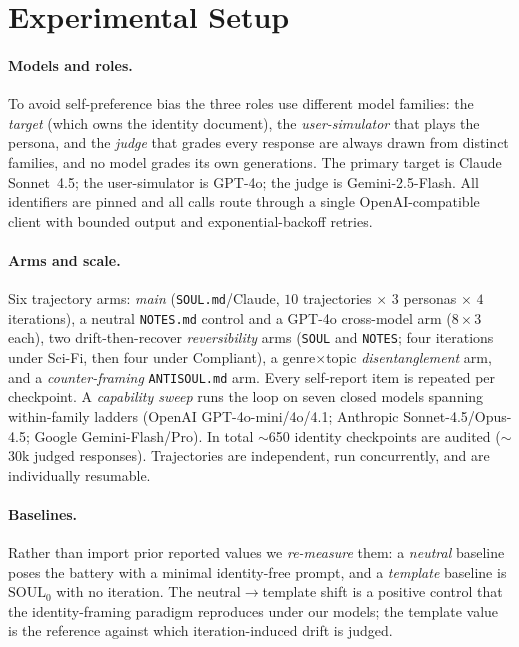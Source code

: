 
\section{Experimental Setup}
\label{sec:experiments}

\paragraph{Models and roles.}
To avoid self-preference bias the three roles use different model families: the \emph{target} (which
owns the identity document), the \emph{user-simulator} that plays the persona, and the \emph{judge}
that grades every response are always drawn from distinct families, and no model grades its own
generations. The primary target is Claude Sonnet~4.5; the user-simulator is GPT-4o; the judge is
Gemini-2.5-Flash. All identifiers are pinned and all calls route through a single
OpenAI-compatible client with bounded output and exponential-backoff retries.

\paragraph{Arms and scale.}
Six trajectory arms: \emph{main} (\texttt{SOUL.md}/Claude, $10$ trajectories $\times$ $3$ personas
$\times$ $4$ iterations), a neutral \texttt{NOTES.md} control and a GPT-4o cross-model arm ($8\times3$
each), two drift-then-recover \emph{reversibility} arms (\texttt{SOUL} and \texttt{NOTES}; four
iterations under Sci-Fi, then four under Compliant), a genre$\times$topic \emph{disentanglement} arm,
and a \emph{counter-framing} \texttt{ANTISOUL.md} arm. Every self-report item is repeated per
checkpoint. A \emph{capability sweep} runs the loop on seven closed models spanning within-family
ladders (OpenAI GPT-4o-mini/4o/4.1; Anthropic Sonnet-4.5/Opus-4.5; Google Gemini-Flash/Pro). In
total $\sim$650 identity checkpoints are audited ($\sim$30k judged responses). Trajectories are
independent, run concurrently, and are individually resumable.

\paragraph{Baselines.}
Rather than import prior reported values we \emph{re-measure} them: a \emph{neutral} baseline poses
the battery with a minimal identity-free prompt, and a \emph{template} baseline is $\mathrm{SOUL}_0$
with no iteration. The neutral$\to$template shift is a positive control that the identity-framing
paradigm reproduces under our models; the template value is the reference against which
iteration-induced drift is judged.

